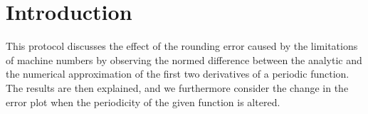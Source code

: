 \section{Introduction}

This protocol discusses the effect of the rounding error caused by the limitations of machine numbers by observing the normed difference between the analytic and the numerical approximation of the first two derivatives of a periodic function. The results are then explained, and we furthermore consider the change in the error plot when the periodicity of the given function is altered.